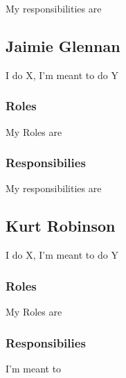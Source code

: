 	My responsibilities are


\subsection{Jaimie Glennan}

I do X, I'm meant to do Y



\subsubsection{Roles}

	My Roles are


\subsubsection{Responsibilies}

	My responsibilities are


\subsection{Kurt Robinson}

I do X, I'm meant to do Y



\subsubsection{Roles}

	My Roles are


\subsubsection{Responsibilies}

	I'm meant to